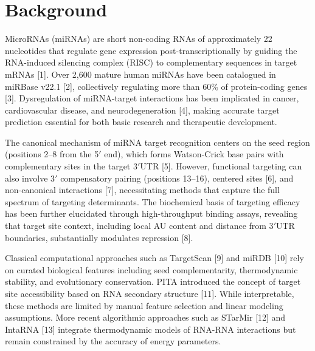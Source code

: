 \documentclass[sn-mathphys-num]{sn-jnl}
\begin{document}

\maketitle

\section{Background}\label{sec:background}

MicroRNAs (miRNAs) are short non-coding RNAs of approximately 22 nucleotides that regulate gene expression post-transcriptionally by guiding the RNA-induced silencing complex (RISC) to complementary sequences in target mRNAs [1]. Over 2,600 mature human miRNAs have been catalogued in miRBase v22.1 [2], collectively regulating more than 60\% of protein-coding genes [3]. Dysregulation of miRNA-target interactions has been implicated in cancer, cardiovascular disease, and neurodegeneration [4], making accurate target prediction essential for both basic research and therapeutic development.

The canonical mechanism of miRNA target recognition centers on the seed region (positions 2--8 from the 5$'$ end), which forms Watson-Crick base pairs with complementary sites in the target 3$'$UTR [5]. However, functional targeting can also involve 3$'$ compensatory pairing (positions 13--16), centered sites [6], and non-canonical interactions [7], necessitating methods that capture the full spectrum of targeting determinants. The biochemical basis of targeting efficacy has been further elucidated through high-throughput binding assays, revealing that target site context, including local AU content and distance from 3$'$UTR boundaries, substantially modulates repression [8].

Classical computational approaches such as TargetScan [9] and miRDB [10] rely on curated biological features including seed complementarity, thermodynamic stability, and evolutionary conservation. PITA introduced the concept of target site accessibility based on RNA secondary structure [11]. While interpretable, these methods are limited by manual feature selection and linear modeling assumptions. More recent algorithmic approaches such as STarMir [12] and IntaRNA [13] integrate thermodynamic models of RNA-RNA interactions but remain constrained by the accuracy of energy parameters.
\end{document}
